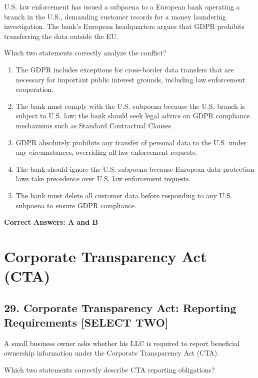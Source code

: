 \documentclass[11pt,a4paper]{article}
\begin{document}
	U.S. law enforcement has issued a subpoena to a European bank operating a branch in the U.S., demanding customer records for a money laundering investigation. The bank's European headquarters argues that GDPR prohibits transferring the data outside the EU.
	
	Which two statements correctly analyze the conflict?
	
	\begin{enumerate}[label=\Alph*.]
		\item The GDPR includes exceptions for cross-border data transfers that are necessary for important public interest grounds, including law enforcement cooperation.
		\item The bank must comply with the U.S. subpoena because the U.S. branch is subject to U.S. law; the bank should seek legal advice on GDPR compliance mechanisms such as Standard Contractual Clauses.
		\item GDPR absolutely prohibits any transfer of personal data to the U.S. under any circumstances, overriding all law enforcement requests.
		\item The bank should ignore the U.S. subpoena because European data protection laws take precedence over U.S. law enforcement requests.
		\item The bank must delete all customer data before responding to any U.S. subpoena to ensure GDPR compliance.
	\end{enumerate}
	
	\textbf{Correct Answers: A and B}
	
	\section{Corporate Transparency Act (CTA)}
	
	\subsection{29. Corporate Transparency Act: Reporting Requirements \textnormal{[SELECT TWO]}}
	
	A small business owner asks whether his LLC is required to report beneficial ownership information under the Corporate Transparency Act (CTA).
	
	Which two statements correctly describe CTA reporting obligations?
	
\end{document}
